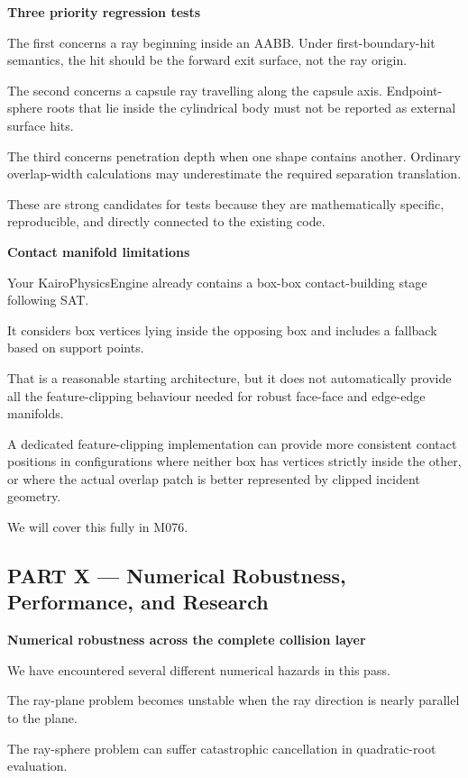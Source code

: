 \textbf{Three priority regression tests}

The first concerns a ray beginning inside an AABB. Under first-boundary-hit semantics, the hit should be the forward exit surface, not the ray origin.

The second concerns a capsule ray travelling along the capsule axis. Endpoint-sphere roots that lie inside the cylindrical body must not be reported as external surface hits.

The third concerns penetration depth when one shape contains another. Ordinary overlap-width calculations may underestimate the required separation translation.

These are strong candidates for tests because they are mathematically specific, reproducible, and directly connected to the existing code.

\textbf{Contact manifold limitations}

Your KairoPhysicsEngine already contains a box-box contact-building stage following SAT.

It considers box vertices lying inside the opposing box and includes a fallback based on support points.

That is a reasonable starting architecture, but it does not automatically provide all the feature-clipping behaviour needed for robust face-face and edge-edge manifolds.

A dedicated feature-clipping implementation can provide more consistent contact positions in configurations where neither box has vertices strictly inside the other, or where the actual overlap patch is better represented by clipped incident geometry.

We will cover this fully in M076.

\subsection{PART X --- Numerical Robustness, Performance, and Research}\label{04-visual-computing-ii-ch025-part-x-numerical-robustness-performance-and-research}

\textbf{Numerical robustness across the complete collision layer}

We have encountered several different numerical hazards in this pass.

The ray-plane problem becomes unstable when the ray direction is nearly parallel to the plane.

The ray-sphere problem can suffer catastrophic cancellation in quadratic-root evaluation.

